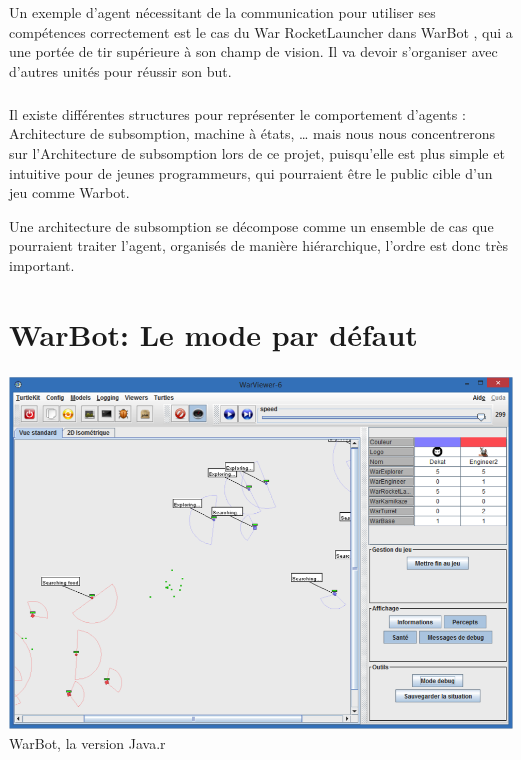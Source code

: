 \documentclass{report}
\begin{document}
Un exemple d’agent nécessitant de la communication pour utiliser ses compétences correctement est le cas du War RocketLauncher dans WarBot , qui a une portée de tir supérieure à son champ de vision. Il va devoir s’organiser avec d’autres unités pour réussir son but.
\paragraph{}
Il existe différentes structures pour représenter le comportement d’agents : Architecture de subsomption, machine à états, … mais nous nous concentrerons sur l’Architecture de subsomption lors de ce projet, puisqu’elle est plus simple et intuitive pour de jeunes programmeurs, qui pourraient être le public cible d’un jeu comme Warbot.

Une architecture de subsomption se décompose comme un ensemble de cas que pourraient traiter l’agent, organisés de manière hiérarchique, l’ordre est donc très important.

\newpage
\chapter{WarBot: Le mode par défaut}

\paragraph{}
\begin{center}
\includegraphics[scale=0.7]{DATA/warbotjava.png}
 {WarBot, la version Java.r}
\end{center}
\paragraph{}
\end{document}
